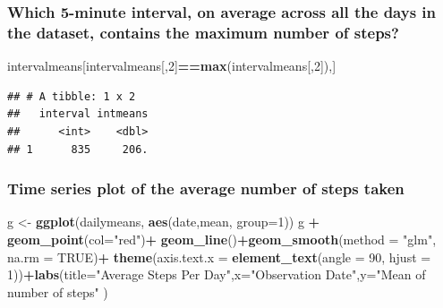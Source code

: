\documentclass[]{article}
\newenvironment{Shaded}{\begin{snugshade}}{\end{snugshade}}
\newcommand{\KeywordTok}[1]{\textcolor[rgb]{0.13,0.29,0.53}{\textbf{#1}}}
\newcommand{\DataTypeTok}[1]{\textcolor[rgb]{0.13,0.29,0.53}{#1}}
\newcommand{\DecValTok}[1]{\textcolor[rgb]{0.00,0.00,0.81}{#1}}
\newcommand{\StringTok}[1]{\textcolor[rgb]{0.31,0.60,0.02}{#1}}
\newcommand{\OtherTok}[1]{\textcolor[rgb]{0.56,0.35,0.01}{#1}}
\newcommand{\OperatorTok}[1]{\textcolor[rgb]{0.81,0.36,0.00}{\textbf{#1}}}
\newcommand{\NormalTok}[1]{#1}
\begin{document}
\subsubsection{Which 5-minute interval, on average across all the days
in the dataset, contains the maximum number of
steps?}\label{which-5-minute-interval-on-average-across-all-the-days-in-the-dataset-contains-the-maximum-number-of-steps}

\begin{Shaded}
\begin{Highlighting}[]
\NormalTok{intervalmeans[intervalmeans[,}\DecValTok{2}\NormalTok{]}\OperatorTok{==}\KeywordTok{max}\NormalTok{(intervalmeans[,}\DecValTok{2}\NormalTok{]),]}
\end{Highlighting}
\end{Shaded}

\begin{verbatim}
## # A tibble: 1 x 2
##   interval intmeans
##      <int>    <dbl>
## 1      835     206.
\end{verbatim}

\subsubsection{Time series plot of the average number of steps
taken}\label{time-series-plot-of-the-average-number-of-steps-taken}

\begin{Shaded}
\begin{Highlighting}[]
\NormalTok{g <-}\StringTok{ }\KeywordTok{ggplot}\NormalTok{(dailymeans, }\KeywordTok{aes}\NormalTok{(date,mean, }\DataTypeTok{group=}\DecValTok{1}\NormalTok{))}
\NormalTok{g }\OperatorTok{+}\StringTok{ }\KeywordTok{geom_point}\NormalTok{(}\DataTypeTok{col=}\StringTok{"red"}\NormalTok{)}\OperatorTok{+}\StringTok{ }\KeywordTok{geom_line}\NormalTok{()}\OperatorTok{+}\KeywordTok{geom_smooth}\NormalTok{(}\DataTypeTok{method =} \StringTok{"glm"}\NormalTok{, }\DataTypeTok{na.rm =} \OtherTok{TRUE}\NormalTok{)}\OperatorTok{+}\StringTok{ }\KeywordTok{theme}\NormalTok{(}\DataTypeTok{axis.text.x =} \KeywordTok{element_text}\NormalTok{(}\DataTypeTok{angle =} \DecValTok{90}\NormalTok{, }\DataTypeTok{hjust =} \DecValTok{1}\NormalTok{))}\OperatorTok{+}\KeywordTok{labs}\NormalTok{(}\DataTypeTok{title=}\StringTok{"Average Steps Per Day"}\NormalTok{,}\DataTypeTok{x=}\StringTok{"Observation Date"}\NormalTok{,}\DataTypeTok{y=}\StringTok{"Mean of number of steps"}\NormalTok{ )}
\end{Highlighting}
\end{Shaded}
\end{document}
